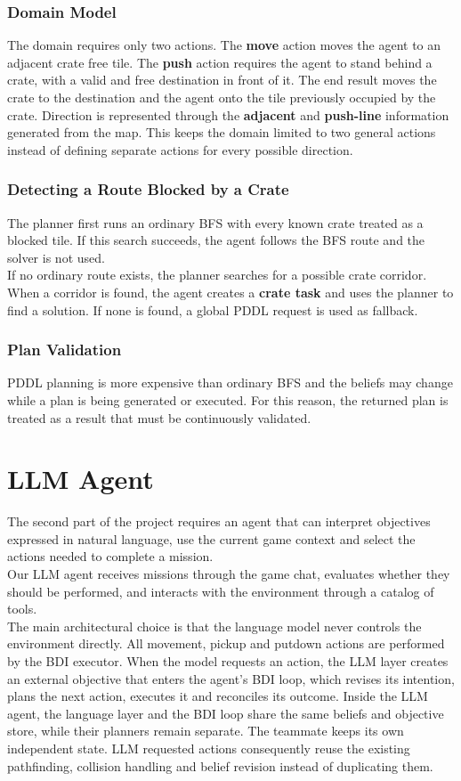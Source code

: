 \documentclass[11pt,a4paper]{article}
\begin{document}
\subsubsection{Domain Model}
The domain requires only two actions. 
The \textbf{move} action moves the agent to an adjacent crate free tile. 
The \textbf{push} action requires the agent to stand behind a crate, with a valid and free destination in front of it. 
The end result moves the crate to the destination and the agent onto the tile previously occupied by the crate.
Direction is represented through the \textbf{adjacent} and \textbf{push-line} information generated from the map.
This keeps the domain limited to two general actions instead of defining separate actions for every possible direction.

\subsubsection{Detecting a Route Blocked by a Crate}
The planner first runs an ordinary BFS with every known crate treated as a blocked tile.
If this search succeeds, the agent follows the BFS route and the solver is not used.
\\If no ordinary route exists, the planner searches for a possible crate corridor. 
When a corridor is found, the agent creates a \textbf{crate task} and uses the planner to find a solution. 
If none is found, a global PDDL request is used as fallback.

\subsubsection{Plan Validation}
PDDL planning is more expensive than ordinary BFS and the beliefs may change while a plan is being generated or executed.
For this reason, the returned plan is treated as a result that must be continuously validated.

\section{LLM Agent}
The second part of the project requires an agent that can interpret objectives expressed in natural
language, use the current game context and select the actions needed to complete a mission. 
\\Our LLM agent receives missions through the game chat, evaluates whether they should be performed, and interacts with the environment through a catalog of tools.
\\The main architectural choice is that the language model never controls the environment directly.
All movement, pickup and putdown actions are performed by the BDI executor. 
When the model requests an action, the LLM layer creates an external objective that enters the agent's BDI loop, which revises its intention, plans the next action, executes it and reconciles its outcome.
Inside the LLM agent, the language layer and the BDI loop share the same beliefs and objective store, while their planners remain separate. The teammate keeps its own independent state.
LLM requested actions consequently reuse the existing pathfinding, collision handling and belief revision instead of duplicating them.
\end{document}
